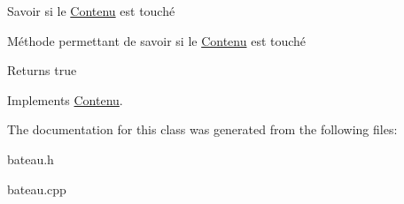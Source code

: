 Savoir si le \hyperlink{class_contenu}{Contenu} est touché 

Méthode permettant de savoir si le \hyperlink{class_contenu}{Contenu} est touché

\begin{DoxyReturn}{Returns}
true 
\end{DoxyReturn}


Implements \hyperlink{class_contenu_af917356550ccc6025373c652b6e8b938}{Contenu}.



The documentation for this class was generated from the following files\+:\begin{DoxyCompactItemize}
\item 
bateau.\+h\item 
bateau.\+cpp\end{DoxyCompactItemize}
